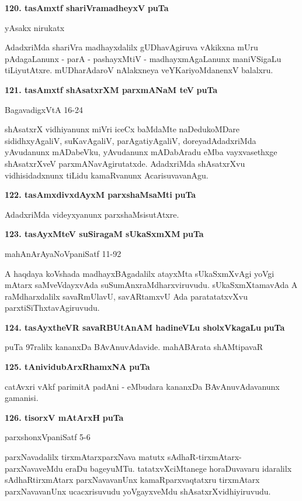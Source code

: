 \medskip
\noindent
\textbf{120. tasAmxtf shariVramadheyxV} \hfill{\bf puTa \pageref{153}}

\hfill{yAsakx nirukatx}

\smallskip
AdadxriMda shariVra madhayxdalilx gUDhavAgiruva vAkikxna mUru pAdagaLanunx - parA - pashayxMtiV - madhayxmAgaLanunx maniVSigaLu tiLiyutAtxre. mUDharAdaroV nAlakxneya veYKariyoMdanenxV balalxru.

\medskip
\noindent
\textbf{121. tasAmxtf shAsatxrXM parxmANaM teV} \hfill{\bf puTa \pageref{87}}

\hfill{BagavadigxVtA 16-24}

\smallskip
shAsatxrX vidhiyanunx miVri iceCx baMdaMte naDedukoMDare sididhxyAgaliV, suKavAgaliV, parAgati\-yAgaliV, doreyadAdadxriMda yAvudanunx mADabeVku, yAvudanunx mADabAradu eMba vayxvasethxge shAsatxrXveV parxmANavAgirutatxde. AdadxriMda shAsatxrXvu vidhisidadxnunx tiLidu kamaRvanunx AcarisuvavanAgu.

\medskip
\noindent
\textbf{122. tasAmxdivxdAyxM parxshaMsaMti} \hfill{\bf puTa \pageref{86}}

\smallskip
AdadxriMda videyxyanunx parxshaMsisutAtxre.

\medskip
\noindent
\textbf{123. tasAyxMteV suSiragaM sUkaSxmXM} \hfill{\bf puTa \pageref{124}}

\hfill{mahAnArAyaNoVpaniSatf 11-92}

\smallskip
A haqdaya koVshada madhayxBAgadalilx atayxMta sUkaSxmXvAgi yoVgi mAtarx saMveVdayxvAda suSumAnx\-raMdharxviruvudu. sUkaSxmXtamavAda A raMdharxdalilx savaRmUlavU, savARtamxvU Ada paratatatxvXvu parxtiSiThxta\-vAgiruvudu.

\eject

\noindent
\textbf{124. tasAyxtheVR savaRBUtAnAM hadineVLu sholxVkagaLu} \hfill{\bf puTa \pageref{96}}

puTa 97ralilx kananxDa BAvAnuvAdavide. \hfill{mahABArata shAMtipavaR}

\smallskip

\noindent
\textbf{125. tAnividubArxRhamxNA} \hfill{\bf puTa \pageref{205}}

\smallskip
catAvxri vAkf parimitA padAni - eMbudara kananxDa BAvAnuvAdavanunx gamanisi.

\medskip
\noindent
\textbf{126. tisorxV mAtArxH} \hfill{\bf puTa \pageref{148}}

\hfill{parxshonxVpaniSatf 5-6}

\smallskip
parxNavadalilx tirxmAtarxparxNava matutx sAdhaR-tirxmAtarx-parxNavaveMdu eraDu bage\break\-yuMTu. tatatxvXciMta\-nege horaDuvavaru idaralilx sAdhaRtirxmAtarx parxNavavanUnx kamaRparxvaqtatxru tirxmAtarx parxNavavanUnx ucacxrisu\-vudu yoVgayxveMdu shAsatxrX\-vidhiyiruvudu.

